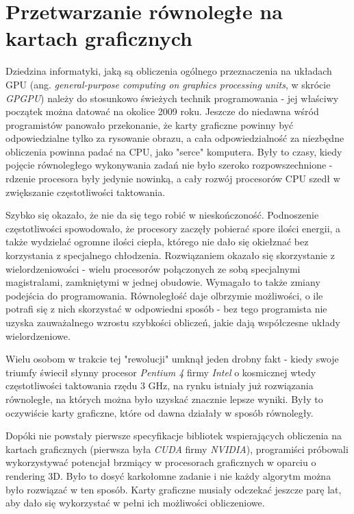 \documentclass[12pt]{article}
\begin{document}
\newpage

\section{Przetwarzanie równoległe na kartach graficznych}

Dziedzina informatyki, jaką są obliczenia ogólnego przeznaczenia na układach GPU (ang. \textit{general-purpose computing on graphics processing units}, w skrócie \textit{GPGPU}) należy do stosunkowo świeżych technik programowania - jej właściwy początek można datować na okolice 2009 roku. Jeszcze do niedawna wśród programistów panowało przekonanie, że karty graficzne powinny być odpowiedzialne tylko za rysowanie obrazu, a cała odpowiedzialność za niezbędne obliczenia powinna padać na CPU, jako "serce" komputera. Były to czasy, kiedy pojęcie równoległego wykonywania zadań nie było szeroko rozpowszechnione - rdzenie procesora były jedynie nowinką, a cały rozwój procesorów CPU szedł w zwiększanie częstotliwości taktowania.

Szybko się okazało, że nie da się tego robić w nieskończoność. Podnoszenie częstotliwości spowodowało, że procesory zaczęły pobierać spore ilości energii, a także wydzielać ogromne ilości ciepła, którego nie dało się okiełznać bez korzystania z specjalnego chłodzenia. Rozwiązaniem okazało się skorzystanie z wielordzeniowości - wielu procesorów połączonych ze sobą specjalnymi magistralami, zamkniętymi w jednej obudowie. Wymagało to także zmiany podejścia do programowania. Równoległość daje olbrzymie możliwości, o ile potrafi się z nich skorzystać w odpowiedni sposób - bez tego programista nie uzyska zauważalnego wzrostu szybkości obliczeń, jakie dają współczesne układy wielordzeniowe. 

Wielu osobom w trakcie tej "rewolucji" umknął jeden drobny fakt - kiedy swoje triumfy świecił słynny procesor \textit{Pentium 4} firmy \textit{Intel} o kosmicznej wtedy częstotliwości taktowania rzędu 3 GHz, na rynku istniały już rozwiązania równoległe, na których można było uzyskać znacznie lepsze wyniki. Były to oczywiście karty graficzne, które od dawna działały w sposób równoległy. 

Dopóki nie powstały pierwsze specyfikacje bibliotek wspierających obliczenia na kartach graficznych (pierwsza była \textit{CUDA} firmy \textit{NVIDIA}), programiści próbowali wykorzystywać potencjał brzmiący w procesorach graficznych w oparciu o rendering 3D. Było to dosyć karkołomne zadanie i nie każdy algorytm można było rozwiązać w ten sposób. Karty graficzne musiały odczekać jeszcze parę lat, aby dało się wykorzystać w pełni ich możliwości obliczeniowe.
\end{document}
